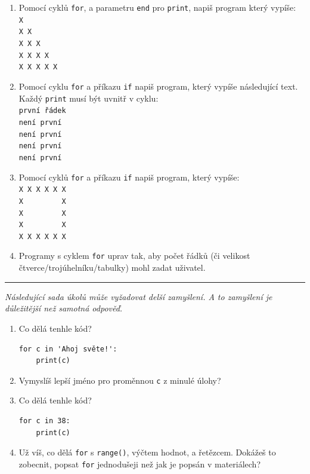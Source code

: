 \documentclass[a4paper,10pt]{article}
\newcommand\startsection[1]{
     \vspace{0.2ex}
    \hrule
    {\fontspec{Oxygen} \tiny
     \vspace{-1ex}
     \emph{#1}
     \vspace{-1.5em}
    }
}
\begin{document}
\begin{enumerate}[resume]
\item Pomocí cyklů \verb+for+, a parametru \verb+end+ pro \verb+print+, napiš program který vypíše:
\\\verb+X+
\\\verb+X X+
\\\verb+X X X+
\\\verb+X X X X+
\\\verb+X X X X X+

\item Pomocí cyklu \verb+for+ a příkazu \verb+if+ napiš program, který vypíše následující text. Každý \texttt{print} musí být uvnitř v cyklu:
\\\verb+první řádek+
\\\verb+není první+
\\\verb+není první+
\\\verb+není první+
\\\verb+není první+

\item Pomocí cyklů \verb+for+ a příkazu \verb+if+ napiš program, který vypíše:
\\\verb+X X X X X X+
\\\verb+X         X+
\\\verb+X         X+
\\\verb+X         X+
\\\verb+X X X X X X+

\item Programy s cyklem \verb+for+ uprav tak, aby počet řádků
    (či velikost čtverce/trojúhelníku/tabulky)
    mohl zadat uživatel.

\end{enumerate}

\startsection{Následující sada úkolů může vyžadovat delší zamyšlení. A to zamyšlení je důležitější než samotná odpověď.}

\begin{enumerate}[resume]
\item Co dělá tenhle kód?
\begin{verbatim}
for c in 'Ahoj světe!':
    print(c)
\end{verbatim}

\item Vymyslíš lepší jméno pro proměnnou \verb+c+ z minulé úlohy?

\item Co dělá tenhle kód?
\begin{verbatim}
for c in 38:
    print(c)
\end{verbatim}

\item Už víš, co dělá \texttt{for} s \texttt{range()}, výčtem hodnot, a řetězcem.
    Dokážeš to zobecnit, popsat \texttt{for} jednodušeji než jak je popsán v materiálech?

\end{enumerate}
\end{document}
